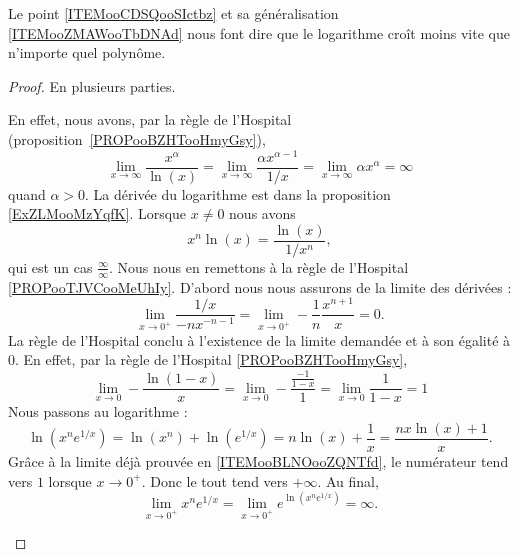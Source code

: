 Le point \ref{ITEMooCDSQooSIctbz} et sa généralisation \ref{ITEMooZMAWooTbDNAd} nous font dire que le logarithme croît moins vite que n'importe quel polynôme.

\begin{proof}
	En plusieurs parties.
	\begin{subproof}
		En effet, nous avons, par la règle de l'Hospital (proposition~\ref{PROPooBZHTooHmyGsy}),
		\begin{equation}
			\lim_{x\to\infty} \frac{ x^{\alpha} }{ \ln(x) }=\lim_{x\to\infty} \frac{ \alpha x^{\alpha-1} }{ 1/x }=\lim_{x\to\infty} \alpha x^{\alpha}=\infty
		\end{equation}
		quand \( \alpha>0\). La dérivée du logarithme est dans la proposition \ref{ExZLMooMzYqfK}.
		Lorsque \( x\neq 0\) nous avons
		\begin{equation}
			x^n\ln(x)=\frac{ \ln(x) }{ 1/x^n },
		\end{equation}
		qui est un cas \( \frac{ \infty }{ \infty }\). Nous nous en remettons à la règle de l'Hospital \ref{PROPooTJVCooMeUhIy}. D'abord nous nous assurons de la limite des dérivées :
		\begin{equation}
			\lim_{x\to 0^+} \frac{ 1/x }{ -nx^{-n-1} }=\lim_{x\to 0^+} -\frac{1}{ n }\frac{ x^{n+1} }{ x }=0.
		\end{equation}
		La règle de l'Hospital conclu à l'existence de la limite demandée et à son égalité à \( 0\).
		En effet, par la règle de l'Hospital \ref{PROPooBZHTooHmyGsy},
		\begin{equation}    \label{EqGICpOX}
			\lim_{x\to 0} -\frac{ \ln(1-x) }{ x }=\lim_{x\to 0} -\frac{ \frac{ -1 }{ 1-x } }{ 1 }=\lim_{x\to 0} \frac{1}{ 1-x }=1
		\end{equation}
		Nous passons au logarithme :
		\begin{equation}
			\ln(x^n e^{1/x})=\ln(x^n)+\ln( e^{1/x})=n\ln(x)+\frac{1}{ x }=\frac{ n x\ln(x)+1 }{ x }.
		\end{equation}
		Grâce à la limite déjà prouvée en \ref{ITEMooBLNOooZQNTfd}, le numérateur tend vers \( 1\) lorsque \( x\to 0^+\). Donc le tout tend vers \( +\infty\). Au final,
		\begin{equation}
			\lim_{x\to 0^+} x^n e^{1/x}=\lim_{x\to 0^+}  e^{\ln(x^n e^{1/x})}=\infty.
		\end{equation}
	\end{subproof}
\end{proof}

